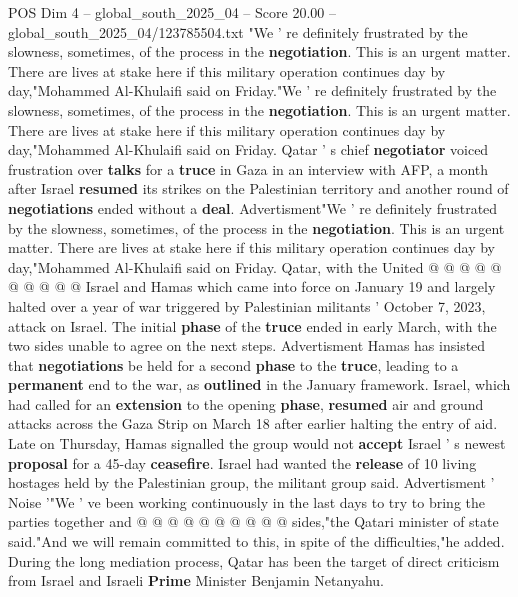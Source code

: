 \begin{textsample}{POS Dim 4 – global\_south\_2025\_04 – Score 20.00 – global\_south\_2025\_04/123785504.txt}  \label{ex:f4_pos_226}
"We ' re definitely frustrated by the slowness, sometimes, of the process in the \textbf{negotiation}.
This is an urgent matter.
There are lives at stake here if this military operation continues day by day,"Mohammed Al-Khulaifi said on Friday."We ' re definitely frustrated by the slowness, sometimes, of the process in the \textbf{negotiation}.
This is an urgent matter.
There are lives at stake here if this military operation continues day by day,"Mohammed Al-Khulaifi said on Friday.
Qatar ' s chief \textbf{negotiator} voiced frustration over \textbf{talks} for a \textbf{truce} in Gaza in an interview with AFP, a month after Israel \textbf{resumed} its strikes on the Palestinian territory and another round of \textbf{negotiations} ended without a \textbf{deal}.
Advertisment"We ' re definitely frustrated by the slowness, sometimes, of the process in the \textbf{negotiation}.
This is an urgent matter.
There are lives at stake here if this military operation continues day by day,"Mohammed Al-Khulaifi said on Friday.
Qatar, with the United @ @ @ @ @ @ @ @ @ @ Israel and Hamas which came into force on January 19 and largely halted over a year of war triggered by Palestinian militants ' October 7, 2023, attack on Israel.
The initial \textbf{phase} of the \textbf{truce} ended in early March, with the two sides unable to agree on the next steps.
Advertisment Hamas has insisted that \textbf{negotiations} be held for a second \textbf{phase} to the \textbf{truce}, leading to a \textbf{permanent} end to the war, as \textbf{outlined} in the January framework.
Israel, which had called for an \textbf{extension} to the opening \textbf{phase}, \textbf{resumed} air and ground attacks across the Gaza Strip on March 18 after earlier halting the entry of aid.
Late on Thursday, Hamas signalled the group would not \textbf{accept} Israel ' s newest \textbf{proposal} for a 45-day \textbf{ceasefire}.
Israel had wanted the \textbf{release} of 10 living hostages held by the Palestinian group, the militant group said.
Advertisment ' Noise '"We ' ve been working continuously in the last days to try to bring the parties together and @ @ @ @ @ @ @ @ @ @ sides,"the Qatari minister of state said."And we will remain committed to this, in spite of the difficulties,"he added.
During the long mediation process, Qatar has been the target of direct criticism from Israel and Israeli \textbf{Prime} Minister Benjamin Netanyahu.

\end{textsample}
